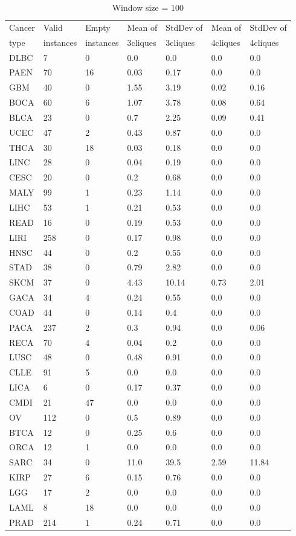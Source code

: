 \documentclass[a4paper,10pt]{article}
\begin{document}
\begin{table}[]
\centering
\caption{Window size = 100}
\label{my-label}
\begin{tabular}{l|l|l|l|l|l|l}
Cancer & Valid & Empty & Mean of & StdDev of& Mean of & StdDev of \\ 
type & instances  & instances & 3cliques & 3cliques & 4cliques & 4cliques \\ \hline 
DLBC&7&0&0.0&0.0&0.0&0.0\\
PAEN&70&16&0.03&0.17&0.0&0.0\\
GBM&40&0&1.55&3.19&0.02&0.16\\
BOCA&60&6&1.07&3.78&0.08&0.64\\
BLCA&23&0&0.7&2.25&0.09&0.41\\
UCEC&47&2&0.43&0.87&0.0&0.0\\
THCA&30&18&0.03&0.18&0.0&0.0\\
LINC&28&0&0.04&0.19&0.0&0.0\\
CESC&20&0&0.2&0.68&0.0&0.0\\
MALY&99&1&0.23&1.14&0.0&0.0\\
LIHC&53&1&0.21&0.53&0.0&0.0\\
READ&16&0&0.19&0.53&0.0&0.0\\
LIRI&258&0&0.17&0.98&0.0&0.0\\
HNSC&44&0&0.2&0.55&0.0&0.0\\
STAD&38&0&0.79&2.82&0.0&0.0\\
SKCM&37&0&4.43&10.14&0.73&2.01\\
GACA&34&4&0.24&0.55&0.0&0.0\\
COAD&44&0&0.14&0.4&0.0&0.0\\
PACA&237&2&0.3&0.94&0.0&0.06\\
RECA&70&4&0.04&0.2&0.0&0.0\\
LUSC&48&0&0.48&0.91&0.0&0.0\\
CLLE&91&5&0.0&0.0&0.0&0.0\\
LICA&6&0&0.17&0.37&0.0&0.0\\
CMDI&21&47&0.0&0.0&0.0&0.0\\
OV&112&0&0.5&0.89&0.0&0.0\\
BTCA&12&0&0.25&0.6&0.0&0.0\\
ORCA&12&1&0.0&0.0&0.0&0.0\\
SARC&34&0&11.0&39.5&2.59&11.84\\
KIRP&27&6&0.15&0.76&0.0&0.0\\
LGG&17&2&0.0&0.0&0.0&0.0\\
LAML&8&18&0.0&0.0&0.0&0.0\\
PRAD&214&1&0.24&0.71&0.0&0.0\\

\end{tabular}
\end{table}
\end{document}
